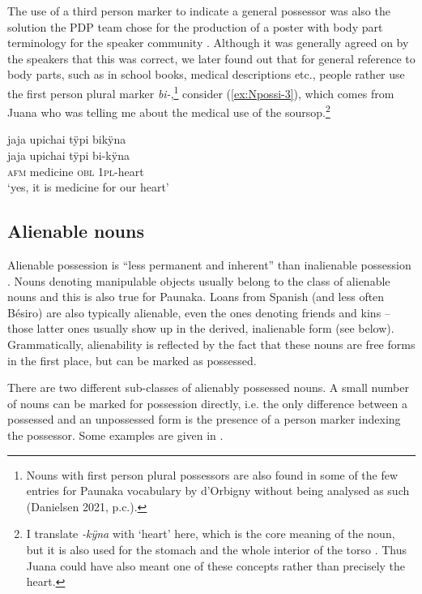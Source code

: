 The use of a third person marker to indicate a general possessor was also the solution the PDP team chose for the production of a poster with body part terminology for the speaker community \citep[cf.][]{PDP2013}. Although it was generally agreed on by the speakers that this was correct, we later found out that for general reference to body parts, such as in school books, medical descriptions etc., people rather use the first person plural marker \textit{bi-},\footnote{Nouns with first person plural possessors are also found in some of the few entries for Paunaka vocabulary by d’Orbigny without being analysed as such (Danielsen 2021, p.c.).} consider (\ref{ex:Npossi-3}), which comes from Juana who was telling me about the medical use of the soursop.\footnote{I translate \textit{-kÿna} with ‘heart’ here, which is the core meaning of the noun, but it is also used for the stomach and the whole interior of the torso \citep[cf.][265]{TerhartDanielsenBODY}. Thus Juana could have also meant one of these concepts rather than precisely the heart.}

\ea\label{ex:Npossi-3}
\begingl
\glpreamble jaja upichai tÿpi bikÿna\\
\gla jaja upichai tÿpi bi-kÿna\\
\glb \textsc{afm} medicine \textsc{obl} 1\textsc{pl}-heart\\
\glft ‘yes, it is medicine for our heart’
\endgl
\trailingcitation{[jxx-e150925l-1.066]}
\xe
{}

\subsection{Alienable nouns}\label{sec:Alienables}

Alienable possession is “less permanent and inherent” than inalienable possession \citep[4]{ChappelMcGregor1996}. Nouns denoting manipulable objects usually belong to the class of alienable nouns and this is also true for Paunaka. Loans from Spanish (and less often Bésiro) are also typically alienable, even the ones denoting friends and kins – those latter ones usually show up in the derived, inalienable form (see below). Grammatically, alienability is reflected by the fact that these nouns are free forms in the first place, but can be marked as possessed.

There are two different sub-classes of alienably possessed nouns. A small number of nouns can be marked for possession directly, i.e. the only difference between a possessed and an unpossessed form is the presence of a person marker indexing the possessor. Some examples are given in .

